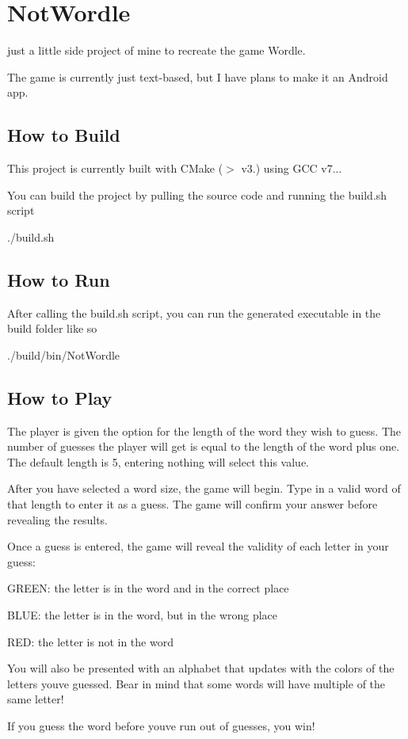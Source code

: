 \href{https://codecov.io/gh/s-merritt/NotWordle}{\tt }

\section*{Not\+Wordle}

just a little side project of mine to recreate the game Wordle.

The game is currently just text-\/based, but I have plans to make it an Android app.

\subsection*{How to Build}

This project is currently built with C\+Make ($>$ v3.) using G\+CC v7...

You can build the project by pulling the source code and running the {\ttfamily build.\+sh} script


\begin{DoxyCode}
./build.sh
\end{DoxyCode}


\subsection*{How to Run}

After calling the {\ttfamily build.\+sh} script, you can run the generated executable in the build folder like so


\begin{DoxyCode}
./build/bin/NotWordle
\end{DoxyCode}


\subsection*{How to Play}

The player is given the option for the length of the word they wish to guess. The number of guesses the player will get is equal to the length of the word plus one. The default length is 5, entering nothing will select this value.

After you have selected a word size, the game will begin. Type in a valid word of that length to enter it as a guess. The game will confirm your answer before revealing the results.

Once a guess is entered, the game will reveal the validity of each letter in your guess\+:


\begin{DoxyItemize}
\item G\+R\+E\+EN\+: the letter is in the word and in the correct place
\item B\+L\+UE\+: the letter is in the word, but in the wrong place
\item R\+ED\+: the letter is not in the word
\end{DoxyItemize}

You will also be presented with an alphabet that updates with the colors of the letters you\textquotesingle{}ve guessed. Bear in mind that some words will have multiple of the same letter!

If you guess the word before you\textquotesingle{}ve run out of guesses, you win! 